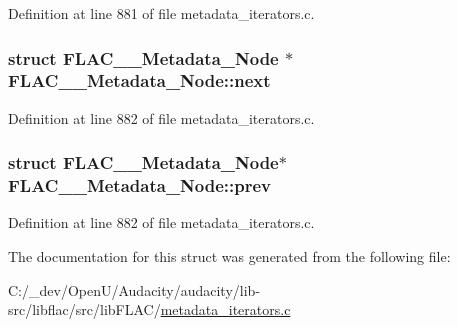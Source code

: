 Definition at line 881 of file metadata\+\_\+iterators.\+c.

\subsubsection[{\texorpdfstring{next}{next}}]{\setlength{\rightskip}{0pt plus 5cm}struct {\bf F\+L\+A\+C\+\_\+\+\_\+\+Metadata\+\_\+\+Node} $\ast$ F\+L\+A\+C\+\_\+\+\_\+\+Metadata\+\_\+\+Node\+::next}\hypertarget{struct_f_l_a_c_____metadata___node_a1bc6351579714b005c2f1ac1e0805b93}{}\label{struct_f_l_a_c_____metadata___node_a1bc6351579714b005c2f1ac1e0805b93}


Definition at line 882 of file metadata\+\_\+iterators.\+c.

\subsubsection[{\texorpdfstring{prev}{prev}}]{\setlength{\rightskip}{0pt plus 5cm}struct {\bf F\+L\+A\+C\+\_\+\+\_\+\+Metadata\+\_\+\+Node}$\ast$ F\+L\+A\+C\+\_\+\+\_\+\+Metadata\+\_\+\+Node\+::prev}\hypertarget{struct_f_l_a_c_____metadata___node_a8fa7a6b6b6a04905e9dc135f43630341}{}\label{struct_f_l_a_c_____metadata___node_a8fa7a6b6b6a04905e9dc135f43630341}


Definition at line 882 of file metadata\+\_\+iterators.\+c.



The documentation for this struct was generated from the following file\+:\begin{DoxyCompactItemize}
\item 
C\+:/\+\_\+dev/\+Open\+U/\+Audacity/audacity/lib-\/src/libflac/src/lib\+F\+L\+A\+C/\hyperlink{metadata__iterators_8c}{metadata\+\_\+iterators.\+c}\end{DoxyCompactItemize}
